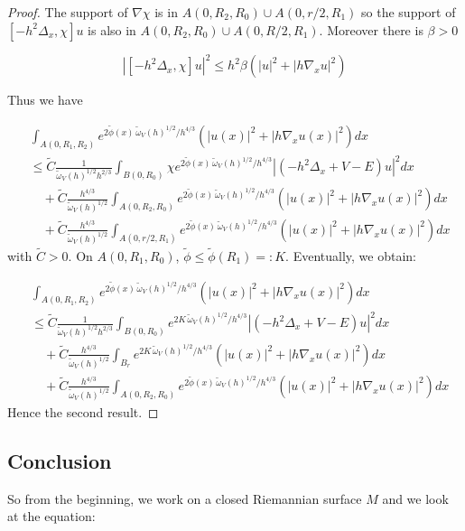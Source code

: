 \documentclass[leqno,11pt,letterpaper, english]{amsart}
\newcommand{\nn}{\nonumber}
\theoremstyle{plain}
\theoremstyle{definition}
\numberwithin{equation}{section}
\begin{document}
\begin{proof}
The support of $\nabla\chi$ is in $A(0,R_2,R_0)\cup A(0,r/2,R_1)$ so the support of $[-h^2\Delta_x ,\chi] u$ is also in $A(0,R_2,R_0)\cup A(0,R/2,R_1)$. Moreover there is $\beta>0$

\begin{equation}
|[-h^2\Delta_x ,\chi] u|^2 \leq  h^2 \beta(|u|^2 +|h\nabla_x u|^2)
\end{equation} 

Thus we have

\begin{align}
    &\int_{A(0,R_1,R_2)} e^{2\tilde{\phi}(x)\,\tilde{\omega}_V(h)^{1/2}/ h^{4/3}} (|u(x)|^2 +|h\nabla_x u(x)|^2)dx\nn\\
    &\leq \tilde{C} \frac{1}{\tilde{\omega}_V(h)^{1/2}h^{2/3}}\int_{B(0,R_0)} \chi e^{2\tilde{\phi}(x)\,\tilde{\omega}_V(h)^{1/2}/ h^{4/3}}|(-h^2\Delta_x + V- E)u|^2dx\nn\\
    &\quad +\tilde{C} \frac{h^{4/3}}{\tilde{\omega}_V(h)^{1/2}}\int_{A(0,R_2,R_0)} e^{2\tilde{\phi}(x)\,\tilde{\omega}_V(h)^{1/2}/ h^{4/3}} (|u(x)|^2 +|h\nabla_x u(x)|^2)dx\nn\\
    &\quad +\tilde{C} \frac{h^{4/3}}{\tilde{\omega}_V(h)^{1/2}}\int_{A(0,r/2,R_1)} e^{2\tilde{\phi}(x)\,\tilde{\omega}_V(h)^{1/2}/ h^{4/3}} (|u(x)|^2 +|h\nabla_x u(x)|^2)dx
\end{align}
with $\tilde{C}>0$. On $A(0,R_1,R_0)$, $\tilde{\phi} \leq \tilde{\phi}(R_1)=:K$. Eventually, we obtain:

\begin{align}
    &\int_{A(0,R_1,R_2)} e^{2\tilde{\phi}(x)\,\tilde{\omega}_V(h)^{1/2}/ h^{4/3}} (|u(x)|^2 +|h\nabla_x u(x)|^2)dx\nn\\
    &\leq \tilde{C} \frac{1}{\tilde{\omega}_V(h)^{1/2}h^{2/3}}\int_{B(0,R_0)} e^{2K\,\tilde{\omega}_V(h)^{1/2}/ h^{4/3}}|(-h^2\Delta_x + V- E)u|^2dx\nn\\
    &\quad + \tilde{C} \frac{h^{4/3}}{\tilde{\omega}_V(h)^{1/2}}\int_{B_r} e^{2K\,\tilde{\omega}_V(h)^{1/2}/ h^{4/3}} (|u(x)|^2 +|h\nabla_x u(x)|^2)dx\nn\\
    &\quad +\tilde{C} \frac{h^{4/3}}{\tilde{\omega}_V(h)^{1/2}}\int_{A(0,R_2,R_0)} e^{2\tilde{\phi}(x)\,\tilde{\omega}_V(h)^{1/2}/ h^{4/3}} (|u(x)|^2 +|h\nabla_x u(x)|^2)dx
\end{align}
Hence the second result.

\end{proof}
\subsection{Conclusion}
So from the beginning, we work on a closed Riemannian surface $M$ and we look at the equation:
\end{document}
